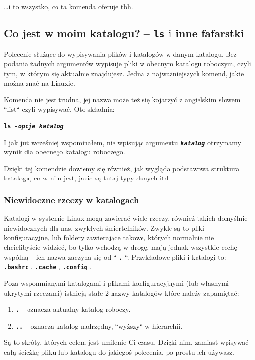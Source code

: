 \documentclass[11pt, a4paper]{article}
\newcommand{\ttbf}[1]{
    \texttt{\textbf{#1}}
}
\begin{document}
\dots i to wszystko, co ta komenda oferuje tbh.

\subsection{Co jest w moim katalogu? -- \ttbf{ls} i inne fafarstki}
\label{sec:ls}

Polecenie służące do wypisywania plików i katalogów w danym katalogu. Bez podania żadnych argumentów wypisuje pliki w obecnym katalogu roboczym, czyli tym, w którym się aktualnie znajdujesz. Jedna z najważniejszych komend, jakie można znać na Linuxie.

Komenda nie jest trudna, jej nazwa może też się kojarzyć z angielskim słowem ``list`` czyli wypisywać. Oto składnia:

\ttbf{ls \emph{-opcje} \emph{katalog}}

I jak już wcześniej wspominałem, nie wpisując argumentu \ttbf{\emph{katalog}} otrzymamy wynik dla obecnego katalogu roboczego.

Dzięki tej komendzie dowiemy się również, jak wygląda podstawowa struktura katalogu, co w nim jest, jakie są tutaj typy danych itd.

\subsubsection{Niewidoczne rzeczy w katalogach}

Katalogi w systemie Linux mogą zawierać wiele rzeczy, również takich domyślnie niewidocznych dla nas, zwykłych śmiertelników. Zwykle są to pliki konfiguracyjne, lub foldery zawierające takowe, których normalnie nie chcielibyście widzieć, bo tylko wchodzą w drogę, mają jednak wszystkie cechę wspólną -- ich nazwa zaczyna się od ``\ttbf{.}``. Przykładowe pliki i katalogi to: \ttbf{.bashrc}, \ttbf{.cache}, \ttbf{.config}.

Poza wspomnianymi katalogami i plikami konfiguracyjnymi (lub własnymi ukrytymi rzeczami) istnieją stałe 2 nazwy katalogów które należy zapamiętać:
\begin{enumerate}
    \item \ttbf{.} -- oznacza aktualny katalog roboczy.
    \item \ttbf{..} -- oznacza katalog nadrzędny, ``wyższy`` w hierarchii.
\end{enumerate}

Są to skróty, których celem jest umilenie Ci czasu. Dzięki nim, zamiast wpisywać całą ścieżkę pliku lub katalogu do jakiegoś polecenia, po prostu ich używasz.
\end{document}

